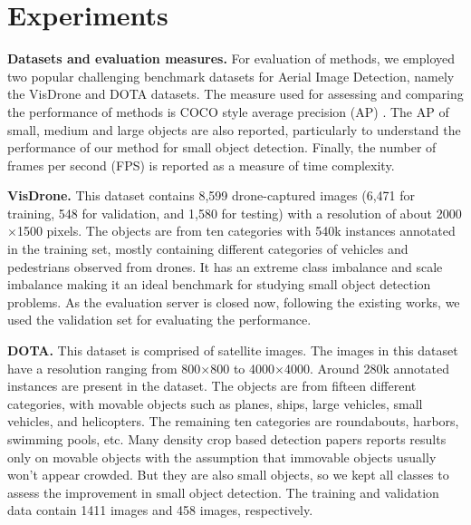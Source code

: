 

\section{Experiments}
\label{sec:experiments}

\noindent \textbf{Datasets and evaluation measures.} For evaluation of methods, we employed two popular challenging benchmark datasets for Aerial Image Detection, namely the VisDrone \cite{zhu-VisDrone-2018} and DOTA \cite{xia-DOTA-2018} datasets. The measure used for assessing and comparing the performance of methods is COCO style average precision (AP) \cite{mscoco-Lin-2014}. The AP of small, medium and large objects are also reported, particularly to understand the performance of our method for small object detection. Finally, the number of frames per second (FPS) is reported as a measure of time complexity.

\noindent \textbf{VisDrone.} This dataset contains  8,599 drone-captured images (6,471
for training, 548 for validation, and 1,580 for testing) with a resolution of about 2000 $\times$1500 pixels. The objects are from ten categories with 540k instances annotated in the training set, mostly containing different categories of vehicles and pedestrians observed from drones. It has an extreme class imbalance and scale imbalance making it an ideal benchmark for studying small object detection problems. As the evaluation server is closed now, following the existing works, we used the validation set for evaluating the performance.

\noindent \textbf{DOTA.} This dataset is comprised of satellite images. The images in this dataset have a resolution ranging from 800$\times$800 to 4000$\times$4000. Around 280k annotated instances are present in the dataset. The objects are from fifteen different categories, with movable objects such as planes, ships, large vehicles, small vehicles, and helicopters. The remaining ten categories are roundabouts, harbors, swimming pools, etc. Many density crop based detection papers reports results only on movable objects\cite{clusnet-Yang-2019} with the assumption that immovable objects usually won't appear crowded. But they are also small objects, so we kept all classes to assess the improvement in small object detection. The training and validation data contain 1411 images and 458 images, respectively.

